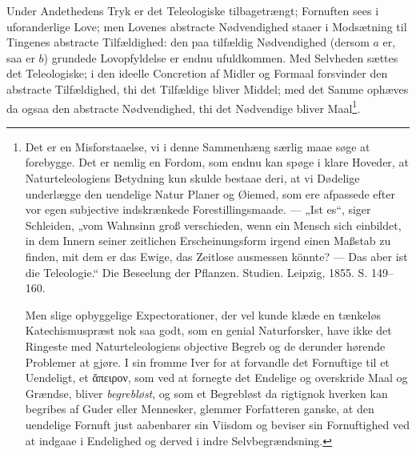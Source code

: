 \documentclass[11pt]{book}
\begin{document}
Under Andethedens Tryk er det Teleologiske tilbagetrængt; Fornuften sees i
uforanderlige Love; men Lovenes abstracte Nødvendighed staaer i Modsætning
til Tingenes abstracte Tilfældighed: den paa tilfældig Nødvendighed (dersom
$a$ er, saa er $b$) grundede Lovopfyldelse er endnu ufuldkommen. Med
Selvheden sættes det Teleologiske; i den ideelle Concretion af Midler og
Formaal forsvinder den abstracte Tilfældighed, thi det Tilfældige bliver
Middel; med det Samme ophæves da ogsaa den abstracte Nødvendighed, thi det
Nødvendige bliver Maal\footnote{%
Det er en Misforstaaelse, vi i denne Sammenhæng særlig maae søge at
forebygge. Det er nemlig en Fordom, som endnu kan spøge i klare Hoveder, at
Naturteleologiens Betydning kun skulde bestaae deri, at vi Dødelige
underlægge den uendelige Natur
Planer og Øiemed, som ere afpassede efter vor egen subjective indskrænkede
Forestillingsmaade. --- „Ist es“, siger Schleiden, „vom Wahnsinn groß
verschieden, wenn ein Mensch sich einbildet, in dem Innern seiner zeitlichen
Erscheinungsform irgend einen Maßstab zu finden, mit dem er das Ewige, das
Zeitlose ausmessen könnte? --- Das aber ist die Teleologie.“ Die Beseelung
der Pflanzen. Studien. Leipzig, 1855. S. 149--160.
\par
Men slige opbyggelige Expectorationer, der vel kunde klæde en tænkeløs
Katechismuspræst nok saa godt, som en genial Naturforsker, have ikke det
Ringeste med Naturteleologiens objective Begreb og de derunder hørende
Problemer at gjøre. I sin fromme Iver for at forvandle det Fornuftige til et
Uendeligt, et ἄπειρον, som ved at fornegte det Endelige og overskride Maal
og Grændse, bliver \emph{begrebløst}, og som et Begrebløst da rigtignok
hverken kan begribes af Guder eller Mennesker, glemmer Forfatteren ganske,
at den uendelige Fornuft just aabenbarer sin Viisdom og beviser sin
Fornuftighed ved at indgaae i Endelighed og derved i indre
Selvbegrændsning.}.
\end{document}
